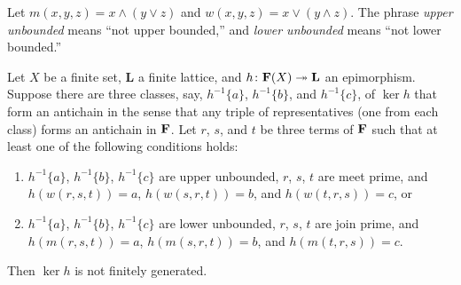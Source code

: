   
Let $m(x,y,z) = x \wedge (y \vee z)$  and 
$w(x,y,z) = x \vee (y \wedge z)$.
The phrase \emph{upper unbounded}  means ``not upper bounded,''
and \emph{lower unbounded} means ``not lower bounded.''
\begin{proposition}
  \label{prop:1.1}
Let $X$ be a finite set, $\mathbf{L}$ a finite lattice, and 
$h\colon \mathbf{F}(X) \twoheadrightarrow \mathbf{L}$ an epimorphism. 
Suppose there are three classes, say,
$h^{-1}\{a\}$, $h^{-1}\{b\}$, and $h^{-1}\{c\}$, of $\ker h$ 
that form an antichain in the sense that
any triple of representatives (one from each class) forms an antichain in $\mathbf{F}$.
Let $r$, $s$, and $t$ be three terms of $\mathbf{F}$
such that at least one of the following conditions holds:
\begin{enumerate}
  \item $h^{-1}\{a\}$, $h^{-1}\{b\}$, $h^{-1}\{c\}$ are upper unbounded, 
  $r$, $s$, $t$ are meet prime, and 
  $h(w(r,s,t)) = a$, $h(w(s,r,t)) = b$, and $h(w(t,r,s)) = c$, or
  \item $h^{-1}\{a\}$, $h^{-1}\{b\}$, $h^{-1}\{c\}$ are lower unbounded, 
  $r$, $s$, $t$ are join prime, and 
    $h(m(r,s,t)) = a$, $h(m(s,r,t)) = b$, and $h(m(t,r,s)) = c$.
\end{enumerate}
Then $\operatorname{ker}h$ is not finitely generated.  
\end{proposition}

